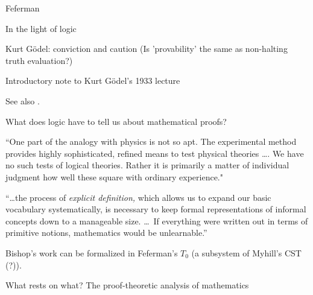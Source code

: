 \begin{plSection}{Feferman}
\begin{plSection}{In the light of logic}
\begin{plSection}{Kurt G\"{o}del: conviction and caution}
(Is 'provability' the same as non-halting truth evaluation?)

\end{plSection}%
\begin{plSection}{Introductory note to Kurt G\"{o}del's 1933 lecture}
\label{sec:Introductory_note_Godel_1933}


See also .

\end{plSection}%
\begin{plSection}{What does logic have to tell us about mathematical proofs?}
\label{sec:What_does_logic_tell_us_about_proofs}


``One part of the analogy with physics is not so apt.
The experimental method provides highly sophisticated, refined
means to test physical theories {\ldots}.
We have no such tests of logical theories.
Rather it is primarily a matter of individual judgment
how well these square with ordinary
experience."~\cite[p~178]{Feferman:1998:LightOfLogic}

``\ldots the process of \textit{explicit definition,} which allows
us to expand our basic vocabulary systematically,
is necessary to keep formal representations of informal concepts
down to a manageable size. \ldots\ 
If everything were written out in terms of primitive notions,
mathematics would be 
unlearnable.''~\cite[p~180]{Feferman:1998:LightOfLogic}

Bishop's work can be formalized 
in Feferman's $T_0$ 
(a subsystem of Myhill's CST  (?)).

\end{plSection}%
\begin{plSection}{What rests on what? The proof-theoretic analysis of mathematics}
\label{sec:What_rests_on_what}


\end{plSection}
\end{plSection}
\end{plSection}
